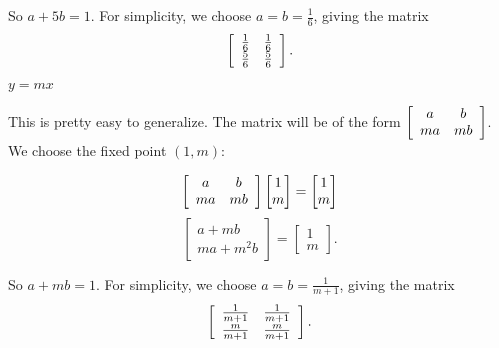 \documentclass[../key.tex]{subfiles}
\begin{document}
So $a+5b=1$. For simplicity, we choose $a=b=\frac{1}{6}$, giving the matrix $$\left[\begin{array}{cc} \frac{1}{6} & \frac{1}{6} \\ \frac{5}{6} & \frac{5}{6} \end{array}\right].$$

\begin{inner_problem}
\item $y=mx$
\end{inner_problem}

This is pretty easy to generalize. The matrix will be of the form $\left[\begin{array}{cc} a & b \\ ma & mb \end{array}\right]$. We choose the fixed point $(1,m)$:

$$\left[\begin{array}{cc} a & b \\ ma & mb \end{array}\right]\begin{bmatrix} 1 \\ m \end{bmatrix} = \begin{bmatrix} 1 \\ m \end{bmatrix}$$
$$\begin{bmatrix} a + mb \\ ma + m^2b \end{bmatrix} = \begin{bmatrix} 1 \\ m \end{bmatrix}.$$

So $a+mb=1$. For simplicity, we choose $a=b=\frac{1}{m+1}$, giving the matrix $$\left[\begin{array}{cc} \frac{1}{m+1} & \frac{1}{m+1} \\ \frac{m}{m+1} & \frac{m}{m+1} \end{array}\right].$$
\end{document}
